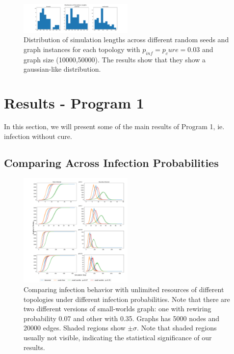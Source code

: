 \documentclass[conference]{IEEEtran}
\begin{document}
\begin{figure}[htb]
  \begin{center}
	\includegraphics[width=0.5\textwidth]{img/distributions.pdf}
  \end{center}
	\caption{Distribution of simulation lengths across different random seeds and graph instances for each topology with $p_{inf} = p_cure = 0.03$ and graph size (10000,50000). The results show that they show a gaussian-like distribution.}
	\label{fig:normal-dist}
\end{figure}

\section{Results - Program 1}

In this section, we will present some of the main results of Program 1, ie. infection without cure.

\subsection{Comparing Across Infection Probabilities}\label{sec:pg1-compare-pis}

\begin{figure}[htb]
  \begin{center}
	\includegraphics[width=0.5\textwidth]{img/pg1-pis-compare_ms_5k.pdf}
  \end{center}
	\caption{Comparing infection behavior with unlimited resources of different topologies under different infection probabilities. Note that there are two different versions of small-worlds graph: one with rewiring probability 0.07 and other with 0.35. Graphs has 5000 nodes and 20000 edges. Shaded regions show $\pm \sigma$. Note that shaded regions usually not visible, indicating the statistical significance of our results.}
	\label{fig:pg1-pis-compare_ms_5k}
\end{figure}
\end{document}
